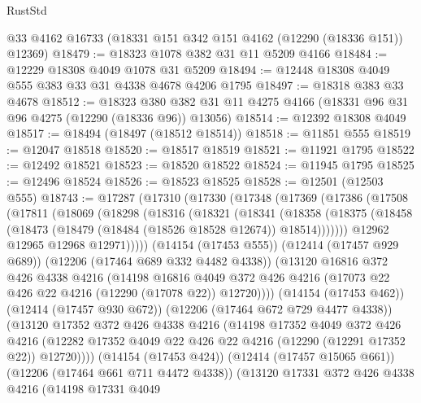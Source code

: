 \begin{lexlean}{RustStd}
\begin{coremodule}
{\begin{coremodule}
{{{{{{{{{{{{{{{{{{{{{{{{{{{{{{{{{{{{{{{{{{{{{{{{{{    @33
    @4162
    @16733
    (@18331 @151 @342 @151 @4162 (@12290 (@18336 @151)) @12369)
@18479 := @18323 @1078 @382 @31 @11 @5209 @4166
@18484 := @12229 @18308 @4049 @1078 @31 @5209
@18494 := @12448 @18308 @4049 @555 @383 @33 @31 @4338 @4678 @4206 @1795
@18497 := @18318 @383 @33 @4678
@18512 := @18323
    @380
    @382
    @31
    @11
    @4275
    @4166
    (@18331 @96 @31 @96 @4275 (@12290 (@18336 @96)) @13056)
@18514 := @12392 @18308 @4049
@18517 := @18494 (@18497 (@18512 @18514))
@18518 := @11851 @555
@18519 := @12047 @18518
@18520 := @18517 @18519
@18521 := @11921 @1795
@18522 := @12492 @18521
@18523 := @18520 @18522
@18524 := @11945 @1795
@18525 := @12496 @18524
@18526 := @18523 @18525
@18528 := @12501 (@12503 @555)
@18743 := @17287
    (@17310
      (@17330
        (@17348
          (@17369
            (@17386
              (@17508
                (@17811
                  (@18069
                    (@18298
                      (@18316
                        (@18321
                          (@18341
                            (@18358
                              (@18375
                                (@18458
                                  (@18473 (@18479 (@18484 (@18526 @18528 @12674)) @18514)))))))
                        @12962
                        @12965
                        @12968
                        @12971)))))
              (@14154 (@17453 @555))
              (@12414 (@17457 @929 @689))
              (@12206 (@17464 @689 @332 @4482 @4338))
              (@13120
                @16816
                @372
                @426
                @4338
                @4216
                (@14198
                  @16816
                  @4049
                  @372
                  @426
                  @4216
                  (@17073 @22 @426 @22 @4216 (@12290 (@17078 @22)) @12720))))
            (@14154 (@17453 @462))
            (@12414 (@17457 @930 @672))
            (@12206 (@17464 @672 @729 @4477 @4338))
            (@13120
              @17352
              @372
              @426
              @4338
              @4216
              (@14198
                @17352
                @4049
                @372
                @426
                @4216
                (@12282 @17352 @4049 @22 @426 @22 @4216 (@12290 (@12291 @17352 @22)) @12720))))
          (@14154 (@17453 @424))
          (@12414 (@17457 @15065 @661))
          (@12206 (@17464 @661 @711 @4472 @4338))
          (@13120
            @17331
            @372
            @426
            @4338
            @4216
            (@14198
              @17331
              @4049
}}}}}}}}}}}}}}}}}}}}}}}}}}}}}}}}}}}}}}}}}}}}}}}}}}
\end{coremodule}}
\end{coremodule}
\end{lexlean}
